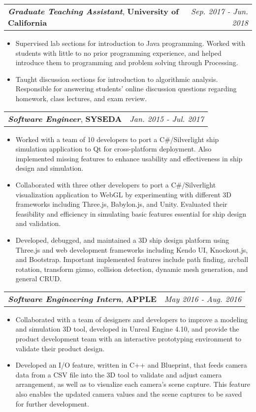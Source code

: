 \documentclass[letterpaper,11pt]{article}
\makeatletter
\newcommand{\resumeItem}[1]{
  \item \small{#1}
}
\newcommand{\resumeExperienceSubheading}[3]{
  \vspace{-1pt}\item
    \begin{tabular*}{0.97\textwidth}[t]{l@{\extracolsep{\fill}}r}
      \textbf{\textit{#1}}, \textbf{#2} & \textit{#3} \\
    \end{tabular*}\vspace{-5pt}
}
\newcommand{\resumeItemListStart}{\begin{itemize}}
\newcommand{\resumeItemListEnd}{\end{itemize}\vspace{-5pt}}
\makeatother
\begin{document}
    \resumeExperienceSubheading
      {Graduate Teaching Assistant}{University of California}{Sep. 2017 - Jun. 2018}
      \resumeItemListStart
        \resumeItem
          {Supervised lab sections for introduction to Java programming. Worked with students with little to no prior programming 
          experience, and helped introduce them to programming and problem solving through Processing.}
        \resumeItem
          {Taught discussion sections for introduction to algorithmic analysis. Responsible for 
          answering students' online discussion questions regarding homework, class lectures, and exam review.}
      \resumeItemListEnd

      \resumeExperienceSubheading
      {Software Engineer}{SYSEDA}{Jan. 2015 - Jul. 2017}
      \resumeItemListStart
        \resumeItem
          {Worked with a team of 10 developers to port a C\#/Silverlight ship simulation application to Qt for cross-platform deployment. 
          Also implemented missing features to enhance usability and effectiveness in ship design and 
          simulation.}
        \resumeItem
          {Collaborated with three other developers to port a C\#/Silverlight visualization application to WebGL by experimenting with 
          different 3D frameworks including Three.js, Babylon.js, and Unity. Evaluated their feasibility and efficiency in simulating 
          basic features essential for ship design and validation.}
        \resumeItem
          {Developed, debugged, and maintained a 3D ship design platform using Three.js and web development frameworks including Kendo UI, 
          Knockout.js, and Bootstrap. Important implemented features include path finding, arcball rotation, transform gizmo, collision 
          detection, dynamic mesh generation, and general CRUD.}
      \resumeItemListEnd

      \resumeExperienceSubheading
      {Software Engineering Intern}{APPLE}{May 2016 - Aug. 2016}
      \resumeItemListStart
        \resumeItem
          {Collaborated with a team of designers and developers to improve a modeling and simulation 3D tool, developed in 
          Unreal Engine 4.10, and provide the product development team with an interactive prototyping environment to validate their 
          product design.}
        \resumeItem
          {Developed an I/O feature, written in C++ and Blueprint, that feeds camera data from a CSV file into the 3D tool to validate 
          and adjust camera arrangement, as well as to visualize each camera’s scene capture. This feature also enables the updated 
          camera values and the scene captures to be saved for further development.}
      \resumeItemListEnd
\end{document}
